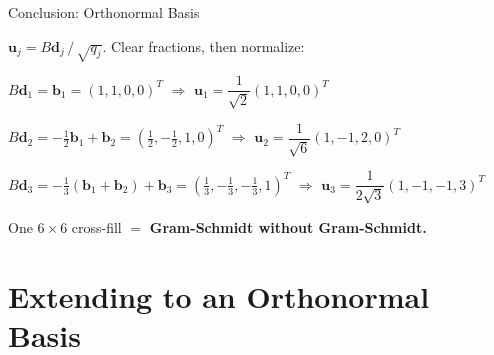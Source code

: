 \documentclass[10pt]{beamer}
\theoremstyle{definition}
\newcommand{\x}[1]{\alert{\textbf{#1}}}
\begin{document}
\begin{frame}{Conclusion: Orthonormal Basis}

$\mathbf{u}_j = B\mathbf{d}_j \,/\, \sqrt{q_j}$. \; Clear fractions, then normalize:

\vspace{0.3em}

$B\mathbf{d}_1 = \mathbf{b}_1 = (1,1,0,0)^T$ \quad $\Longrightarrow$ \quad $\mathbf{u}_1 = \dfrac{1}{\sqrt{2}}(1,1,0,0)^T$

\vspace{0.3em}

$B\mathbf{d}_2 = {-}\tfrac{1}{2}\mathbf{b}_1 + \mathbf{b}_2 = (\tfrac{1}{2},{-}\tfrac{1}{2},1,0)^T$ \quad $\Longrightarrow$ \quad $\mathbf{u}_2 = \dfrac{1}{\sqrt{6}}(1,{-}1,2,0)^T$

\vspace{0.3em}

$B\mathbf{d}_3 = {-}\tfrac{1}{3}(\mathbf{b}_1{+}\mathbf{b}_2) + \mathbf{b}_3 = (\tfrac{1}{3},{-}\tfrac{1}{3},{-}\tfrac{1}{3},1)^T$ \quad $\Longrightarrow$ \quad $\mathbf{u}_3 = \dfrac{1}{2\sqrt{3}}(1,{-}1,{-}1,3)^T$

\vspace{0.5em}

One $6 \times 6$ cross-fill $=$ \x{Gram-Schmidt without Gram-Schmidt.}

\end{frame}


\section{Extending to an Orthonormal Basis}
\end{document}
